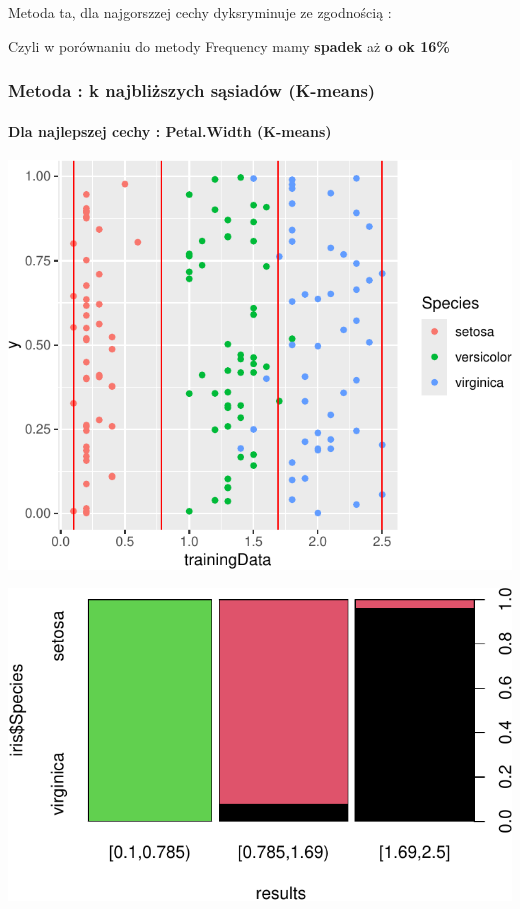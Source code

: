 \documentclass[
  12pt,
]{article}
\begin{document}
Metoda ta, dla najgorszzej cechy dyksryminuje ze zgodnością :

Czyli w porównaniu do metody Frequency mamy \textbf{spadek} aż \textbf{o
ok 16\%}

\subsubsection{Metoda : k najbliższych sąsiadów
(K-means)}\label{metoda-k-najbliux17cszych-sux105siaduxf3w-k-means}

\paragraph{Dla najlepszej cechy : Petal.Width
(K-means)}\label{dla-najlepszej-cechy-petal.width-k-means}

\begin{center}\includegraphics{Sprawozdanie2_files/figure-latex/kMeans_najl-1} \end{center}

\begin{center}\includegraphics{Sprawozdanie2_files/figure-latex/tabela_kondygnacji_3_najl-1} \end{center}
\end{document}
